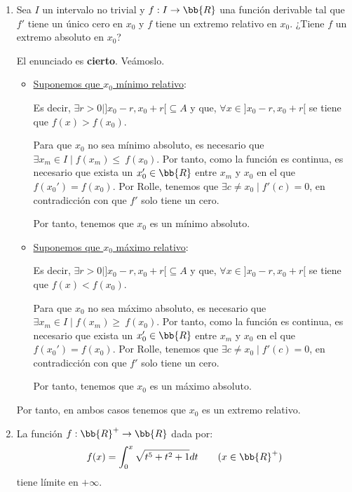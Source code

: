 \documentclass[12pt]{article}
\begin{document}
\begin{ejercicio} 
\begin{enumerate}
        \item Sea $I$ un intervalo no trivial y $f:I\to \bb{R}$ una función derivable tal que $f'$ tiene un único cero en $x_0$ y $f$ tiene un extremo relativo en $x_0$. ¿Tiene $f$ un extremo absoluto en $x_0$?

        El enunciado es \textbf{cierto}. Veámoslo.

        \begin{itemize}
            \item \underline{Suponemos que $x_0$ mínimo relativo}:

            Es decir, $\exists r>0\mid ]x_0-r, x_0+r[\subseteq A$ y que, $\forall x\in ]x_0-r, x_0+r[$ se tiene que $f(x)>f(x_0)$.

            Para que $x_0$ no sea mínimo absoluto, es necesario que $\exists x_m\in I\mid f(x_m)\leq~f(x_0)$. Por tanto, como la función es continua, es necesario que exista un $x_0'\in \bb{R}$ entre $x_m$ y $x_0$ en el que $f(x_0')=f(x_0)$. Por Rolle, tenemos que $\exists c\neq x_0\mid f'(c)=0$, en contradicción con que $f'$ solo tiene un cero.

            Por tanto, tenemos que $x_0$ es un mínimo absoluto.

            \item \underline{Suponemos que $x_0$ máximo relativo}:

            Es decir, $\exists r>0\mid ]x_0-r, x_0+r[\subseteq A$ y que, $\forall x\in ]x_0-r, x_0+r[$ se tiene que $f(x)<f(x_0)$.

            Para que $x_0$ no sea máximo absoluto, es necesario que $\exists x_m\in I\mid f(x_m)\geq~f(x_0)$. Por tanto, como la función es continua, es necesario que exista un $x_0'\in \bb{R}$ entre $x_m$ y $x_0$ en el que $f(x_0')=f(x_0)$. Por Rolle, tenemos que $\exists c\neq x_0\mid f'(c)=0$, en contradicción con que $f'$ solo tiene un cero.

            Por tanto, tenemos que $x_0$ es un máximo absoluto.
        \end{itemize}
        Por tanto, en ambos casos tenemos que $x_0$ es un extremo relativo.

        \item La función $f:\bb{R}^+ \to \bb{R}$ dada por:
        \begin{equation*}
            f(x)=\int_0^x \sqrt{t^5+t^2+1}dt \qquad (x\in \bb{R}^+)
        \end{equation*}
        tiene límite en $+\infty$.\\


\end{enumerate}
\end{ejercicio}
\end{document}
